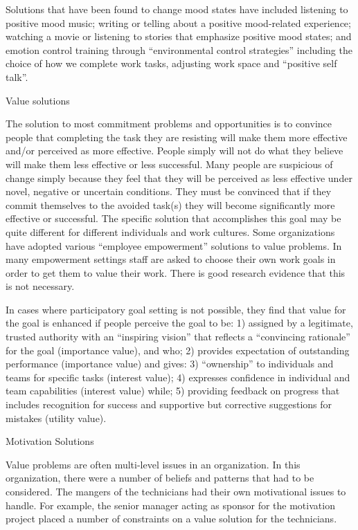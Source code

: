 Solutions that have been found to change mood states have included listening to positive mood music; writing or telling about a positive mood-related experience; watching a movie or listening to stories that emphasize positive mood states; and emotion control training through “environmental control strategies” including the choice of how we complete work tasks, adjusting work space and “positive self talk”.

Value solutions

The solution to most commitment problems and opportunities is to convince people that completing the task they are resisting will make them more effective and/or perceived as more effective. People simply will not do what they believe will make them less effective or less successful. Many people are suspicious of change simply because they feel that they will be perceived as less effective under novel, negative or uncertain conditions. They must be convinced that if they commit themselves to the avoided task(s) they will become significantly more effective or successful. The specific solution that accomplishes this goal may be quite different for different individuals and work cultures. Some organizations have adopted various “employee empowerment” solutions to value problems. In many empowerment settings staff are asked to choose their own work goals in order to get them to value their work. There is good research evidence that this is not necessary.

In cases where participatory goal setting is not possible, they find that value for the goal is enhanced if people perceive the goal to be: 1) assigned by a legitimate, trusted authority with an “inspiring vision” that reflects a “convincing rationale” for the goal (importance value), and who; 2) provides expectation of outstanding performance (importance value) and gives: 3) “ownership” to individuals and teams for specific tasks (interest value); 4) expresses confidence in individual and team capabilities (interest value) while; 5) providing feedback on progress that includes recognition for success and supportive but corrective suggestions for mistakes (utility value).

Motivation Solutions

Value problems are often multi-level issues in an organization. In this organization, there were a number of beliefs and patterns that had to be considered. The mangers of the technicians had their own motivational issues to handle. For example, the senior manager acting as sponsor for the motivation project placed a number of constraints on a value solution for the technicians.

